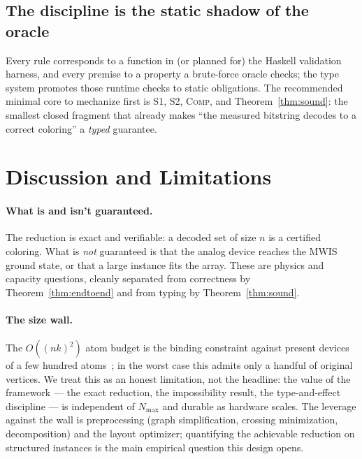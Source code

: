 \documentclass[11pt]{article}
\theoremstyle{definition}
\theoremstyle{remark}
\newcommand{\rn}[1]{\textsc{\footnotesize #1}}
\begin{document}
\subsection{The discipline is the static shadow of the oracle}
\label{sec:code}

Every rule corresponds to a function in (or planned for) the Haskell validation harness,
and every premise to a property a brute-force oracle checks; the type system promotes
those runtime checks to static obligations. The recommended minimal core to mechanize
first is \rn{S1}, \rn{S2}, \rn{Comp}, and Theorem~\ref{thm:sound}: the smallest closed
fragment that already makes ``the measured bitstring decodes to a correct coloring'' a
\emph{typed} guarantee.

\section{Discussion and Limitations}
\label{sec:discussion}

\paragraph{What is and isn't guaranteed.} The reduction is exact and verifiable: a
decoded set of size $n$ is a certified coloring. What is \emph{not} guaranteed is that
the analog device reaches the MWIS ground state, or that a large instance fits the array.
These are physics and capacity questions, cleanly separated from correctness by
Theorem~\ref{thm:endtoend} and from typing by Theorem~\ref{thm:sound}.

\paragraph{The size wall.} The $O((nk)^2)$ atom budget is the binding constraint against
present devices of a few hundred atoms~\cite{Wurtz2023}; in the worst case this admits
only a handful of original vertices. We treat this as an honest limitation, not the
headline: the value of the framework --- the exact reduction, the impossibility result,
the type-and-effect discipline --- is independent of $N_{\max}$ and durable as hardware
scales. The leverage against the wall is preprocessing (graph simplification, crossing
minimization, decomposition) and the layout optimizer; quantifying the achievable
reduction on structured instances is the main empirical question this design opens.
\end{document}
